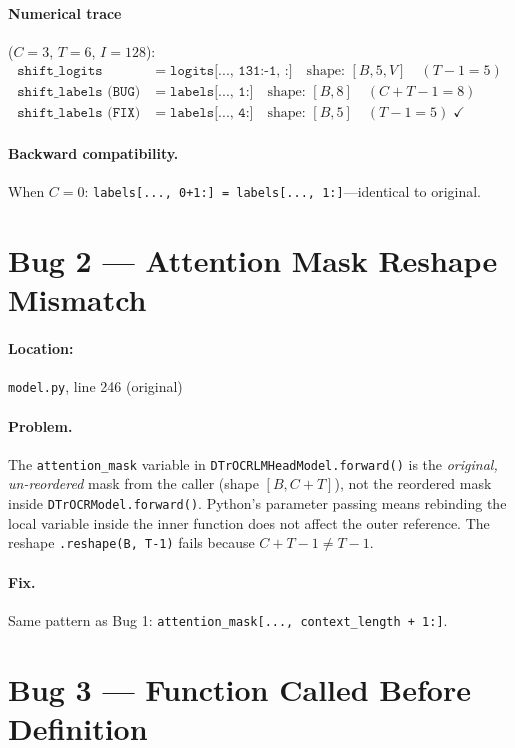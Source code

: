 \documentclass[11pt, a4paper]{report}
\begin{document}
\paragraph{Numerical trace} ($C{=}3$, $T{=}6$, $I{=}128$):
\begin{align*}
  \texttt{shift\_logits} &= \texttt{logits[..., 131:-1, :]} \quad \text{shape: } [B, 5, V] \quad (T{-}1 = 5) \\
  \texttt{shift\_labels (BUG)} &= \texttt{labels[..., 1:]} \quad \text{shape: } [B, 8] \quad (C{+}T{-}1 = 8) \\
  \texttt{shift\_labels (FIX)} &= \texttt{labels[..., 4:]} \quad \text{shape: } [B, 5] \quad (T{-}1 = 5) \; \checkmark
\end{align*}

\paragraph{Backward compatibility.} When $C{=}0$: \texttt{labels[..., 0+1:] = labels[..., 1:]}---identical to original.

\section{Bug 2 --- Attention Mask Reshape Mismatch}
\label{sec:bug2}

\paragraph{Location:} \texttt{model.py}, line 246 (original)

\paragraph{Problem.} The \texttt{attention\_mask} variable in \texttt{DTrOCRLMHeadModel.forward()} is the \emph{original, un-reordered} mask from the caller (shape $[B, C{+}T]$), not the reordered mask inside \texttt{DTrOCRModel.forward()}. Python's parameter passing means rebinding the local variable inside the inner function does not affect the outer reference. The reshape \texttt{.reshape(B, T{-}1)} fails because $C{+}T{-}1 \neq T{-}1$.

\paragraph{Fix.} Same pattern as Bug 1: \texttt{attention\_mask[..., context\_length + 1:]}.

\section{Bug 3 --- Function Called Before Definition}
\label{sec:bug3}
\end{document}

